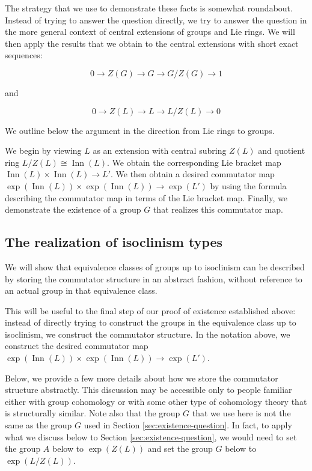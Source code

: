 The strategy that we use to demonstrate these facts is somewhat
roundabout. Instead of trying to answer the question directly, we try
to answer the question in the more general context of central
extensions of groups and Lie rings. We will then apply the results
that we obtain to the central extensions with short exact sequences:

$$0 \to Z(G) \to G \to G/Z(G) \to 1$$

and

$$0 \to Z(L) \to L \to L/Z(L) \to 0$$

We outline below the argument in the direction from Lie rings to groups.

We begin by viewing $L$ as an extension with central subring $Z(L)$
and quotient ring $L/Z(L) \cong \operatorname{Inn}(L)$. We obtain the
corresponding Lie bracket map $\operatorname{Inn}(L) \times
\operatorname{Inn}(L) \to L'$. We then obtain a desired commutator map
$\exp(\operatorname{Inn}(L)) \times \exp(\operatorname{Inn}(L)) \to
\exp(L')$ by using the formula describing the commutator map in terms
of the Lie bracket map. Finally, we demonstrate the existence of a
group $G$ that realizes this commutator map.

\subsection{The realization of isoclinism types}

We will show that equivalence classes of groups up to isoclinism can
be described by storing the commutator structure in an abstract
fashion, without reference to an actual group in that equivalence
class.

This will be useful to the final step of our proof of existence
established above: instead of directly trying to construct the groups
in the equivalence class up to isoclinism, we construct the commutator
structure. In the notation above, we construct the desired commutator
map $\exp(\operatorname{Inn}(L)) \times \exp(\operatorname{Inn}(L))
\to \exp(L')$.

Below, we provide a few more details about how we store the commutator
structure abstractly. This discussion may be accessible only to people
familiar either with group cohomology or with some other type of
cohomology theory that is structurally similar. Note also that the
group $G$ that we use here is not the same as the group $G$ used in
Section \ref{sec:existence-question}. In fact, to apply what we
discuss below to Section \ref{sec:existence-question}, we would need
to set the group $A$ below to $\exp(Z(L))$ and set the group $G$ below
to $\exp(L/Z(L))$.

